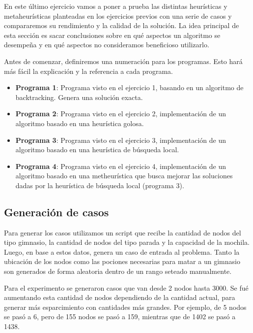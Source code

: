 \par En este último ejercicio vamos a poner a prueba las distintas heurísticas y metaheurísticas planteadas en los ejercicios previos con una serie de casos y compararemos su rendimiento y la calidad de la solución. La idea principal de esta sección es sacar conclusiones sobre en qué aspectos un algoritmo se desempeña y en qué aspectos no consideramos beneficioso utilizarlo.

\par Antes de comenzar, definiremos una numeración para los programas. Esto hará más fácil la explicación y la referencia a cada programa.

\begin{itemize}
	\item \textbf{Programa 1}: Programa visto en el ejercicio 1, basando en un algoritmo de backtracking. Genera una solución exacta.
	\item \textbf{Programa 2}: Programa visto en el ejercicio 2, implementación de un algoritmo basado en una heurística golosa.
	\item \textbf{Programa 3}: Programa visto en el ejercicio 3, implementación de un algoritmo basado en una heurística de búsqueda local.
	\item \textbf{Programa 4}: Programa visto en el ejercicio 4, implementación de un algoritmo basado en una metheurística que busca mejorar las soluciones dadas por la heurística de búsqueda local (programa 3).
\end{itemize}

\subsection{Generación de casos}

\par Para generar los casos utilizamos un script que recibe la cantidad de nodos del tipo gimnasio, la cantidad de nodos del tipo parada y la capacidad de la mochila. Luego, en base a estos datos, genera un caso de entrada al problema. Tanto la ubicación de los nodos como las pociones necesarias para matar a un gimnasio son generados de forma aleatoria dentro de un rango seteado manualmente.

\par Para el experimento se generaron casos que van desde 2 nodos hasta 3000. Se fué aumentando esta cantidad de nodos dependiendo de la cantidad actual, para generar más esparcimiento con cantidades más grandes. Por ejemplo, de 5 nodos se pasó a 6, pero de 155 nodos se pasó a 159, mientras que de 1402 se pasó a 1438.

